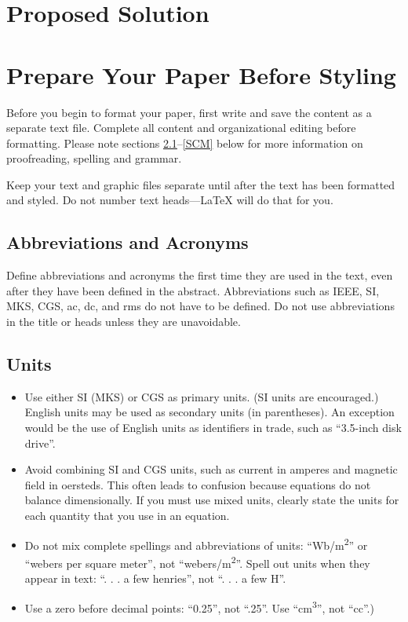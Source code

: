 \documentclass[conference]{IEEEtran}
\begin{document}
\section{Proposed Solution}

\section{Prepare Your Paper Before Styling}
Before you begin to format your paper, first write and save the content as a 
separate text file. Complete all content and organizational editing before 
formatting. Please note sections \ref{AA}--\ref{SCM} below for more information on 
proofreading, spelling and grammar.

Keep your text and graphic files separate until after the text has been 
formatted and styled. Do not number text heads---{\LaTeX} will do that 
for you.

\subsection{Abbreviations and Acronyms}\label{AA}
Define abbreviations and acronyms the first time they are used in the text, 
even after they have been defined in the abstract. Abbreviations such as 
IEEE, SI, MKS, CGS, ac, dc, and rms do not have to be defined. Do not use 
abbreviations in the title or heads unless they are unavoidable.

\subsection{Units}
\begin{itemize}
\item Use either SI (MKS) or CGS as primary units. (SI units are encouraged.) English units may be used as secondary units (in parentheses). An exception would be the use of English units as identifiers in trade, such as ``3.5-inch disk drive''.
\item Avoid combining SI and CGS units, such as current in amperes and magnetic field in oersteds. This often leads to confusion because equations do not balance dimensionally. If you must use mixed units, clearly state the units for each quantity that you use in an equation.
\item Do not mix complete spellings and abbreviations of units: ``Wb/m\textsuperscript{2}'' or ``webers per square meter'', not ``webers/m\textsuperscript{2}''. Spell out units when they appear in text: ``. . . a few henries'', not ``. . . a few H''.
\item Use a zero before decimal points: ``0.25'', not ``.25''. Use ``cm\textsuperscript{3}'', not ``cc''.)
\end{itemize}
\end{document}
